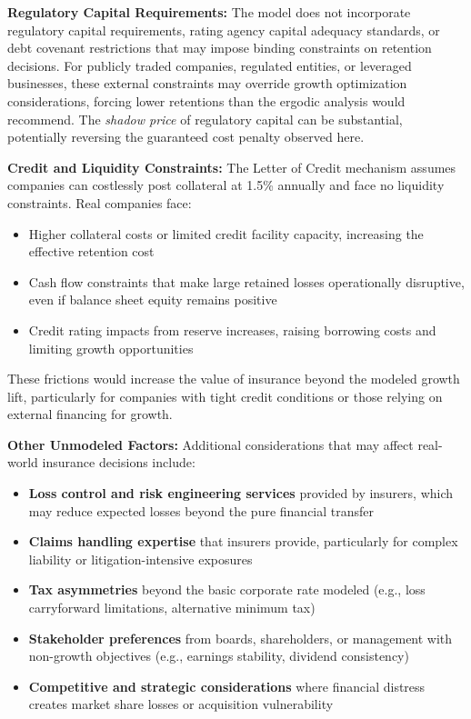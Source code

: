 \documentclass[11pt,letterpaper]{article}
\begin{document}
\vspace{\baselineskip}

\textbf{Regulatory Capital Requirements:} The model does not incorporate regulatory capital requirements, rating agency capital adequacy standards, or debt covenant restrictions that may impose binding constraints on retention decisions. For publicly traded companies, regulated entities, or leveraged businesses, these external constraints may override growth optimization considerations, forcing lower retentions than the ergodic analysis would recommend. The \emph{shadow price} of regulatory capital can be substantial, potentially reversing the guaranteed cost penalty observed here.

\vspace{\baselineskip}

\textbf{Credit and Liquidity Constraints:} The Letter of Credit mechanism assumes companies can costlessly post collateral at 1.5\% annually and face no liquidity constraints. Real companies face:
\begin{itemize}
    \item Higher collateral costs or limited credit facility capacity, increasing the effective retention cost
    \item Cash flow constraints that make large retained losses operationally disruptive, even if balance sheet equity remains positive
    \item Credit rating impacts from reserve increases, raising borrowing costs and limiting growth opportunities
\end{itemize}

These frictions would increase the value of insurance beyond the modeled growth lift, particularly for companies with tight credit conditions or those relying on external financing for growth.

\vspace{\baselineskip}

\textbf{Other Unmodeled Factors:} Additional considerations that may affect real-world insurance decisions include:
\begin{itemize}
    \item \textbf{Loss control and risk engineering services} provided by insurers, which may reduce expected losses beyond the pure financial transfer
    \item \textbf{Claims handling expertise} that insurers provide, particularly for complex liability or litigation-intensive exposures
    \item \textbf{Tax asymmetries} beyond the basic corporate rate modeled (e.g., loss carryforward limitations, alternative minimum tax)
    \item \textbf{Stakeholder preferences} from boards, shareholders, or management with non-growth objectives (e.g., earnings stability, dividend consistency)
    \item \textbf{Competitive and strategic considerations} where financial distress creates market share losses or acquisition vulnerability
\end{itemize}
\end{document}
